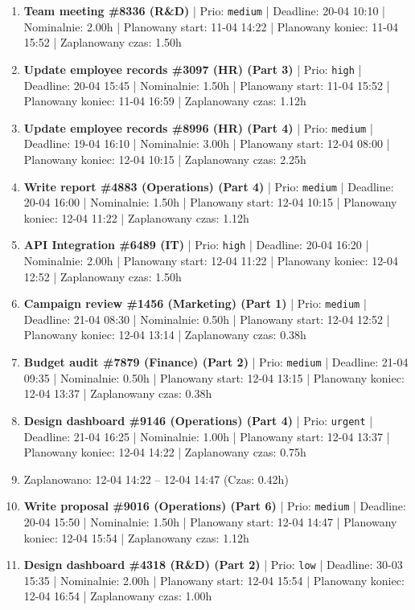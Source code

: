 {\begin{enumerate}
  \item [\textbf{14649}] \textbf{Team meeting \#8336 (R\&D)} | Prio: \texttt{medium} | Deadline: 20-04 10:10 | Nominalnie: 2.00h | Planowany start: 11-04 14:22 | Planowany koniec: 11-04 15:52 | Zaplanowany czas: 1.50h
  \item [\textbf{14621}] \textbf{Update employee records \#3097 (HR) (Part 3)} | Prio: \texttt{high} | Deadline: 20-04 15:45 | Nominalnie: 1.50h | Planowany start: 11-04 15:52 | Planowany koniec: 11-04 16:59 | Zaplanowany czas: 1.12h
  \item [\textbf{14655}] \textbf{Update employee records \#8996 (HR) (Part 4)} | Prio: \texttt{medium} | Deadline: 19-04 16:10 | Nominalnie: 3.00h | Planowany start: 12-04 08:00 | Planowany koniec: 12-04 10:15 | Zaplanowany czas: 2.25h
  \item [\textbf{14651}] \textbf{Write report \#4883 (Operations) (Part 4)} | Prio: \texttt{medium} | Deadline: 20-04 16:00 | Nominalnie: 1.50h | Planowany start: 12-04 10:15 | Planowany koniec: 12-04 11:22 | Zaplanowany czas: 1.12h
  \item [\textbf{14620}] \textbf{API Integration \#6489 (IT)} | Prio: \texttt{high} | Deadline: 20-04 16:20 | Nominalnie: 2.00h | Planowany start: 12-04 11:22 | Planowany koniec: 12-04 12:52 | Zaplanowany czas: 1.50h
  \item [\textbf{14653}] \textbf{Campaign review \#1456 (Marketing) (Part 1)} | Prio: \texttt{medium} | Deadline: 21-04 08:30 | Nominalnie: 0.50h | Planowany start: 12-04 12:52 | Planowany koniec: 12-04 13:14 | Zaplanowany czas: 0.38h
  \item [\textbf{14644}] \textbf{Budget audit \#7879 (Finance) (Part 2)} | Prio: \texttt{medium} | Deadline: 21-04 09:35 | Nominalnie: 0.50h | Planowany start: 12-04 13:15 | Planowany koniec: 12-04 13:37 | Zaplanowany czas: 0.38h
  \item [\textbf{14606}] \textbf{Design dashboard \#9146 (Operations) (Part 4)} | Prio: \texttt{urgent} | Deadline: 21-04 16:25 | Nominalnie: 1.00h | Planowany start: 12-04 13:37 | Planowany koniec: 12-04 14:22 | Zaplanowany czas: 0.75h
  \item [\textbf{PRZERWA}] Zaplanowano: 12-04 14:22 -- 12-04 14:47 (Czas: 0.42h)
  \item [\textbf{14662}] \textbf{Write proposal \#9016 (Operations) (Part 6)} | Prio: \texttt{medium} | Deadline: 20-04 15:50 | Nominalnie: 1.50h | Planowany start: 12-04 14:47 | Planowany koniec: 12-04 15:54 | Zaplanowany czas: 1.12h
  \item [\textbf{14691}] \textbf{Design dashboard \#4318 (R\&D) (Part 2)} | Prio: \texttt{low} | Deadline: 30-03 15:35 | Nominalnie: 2.00h | Planowany start: 12-04 15:54 | Planowany koniec: 12-04 16:54 | Zaplanowany czas: 1.00h

\end{enumerate}}
